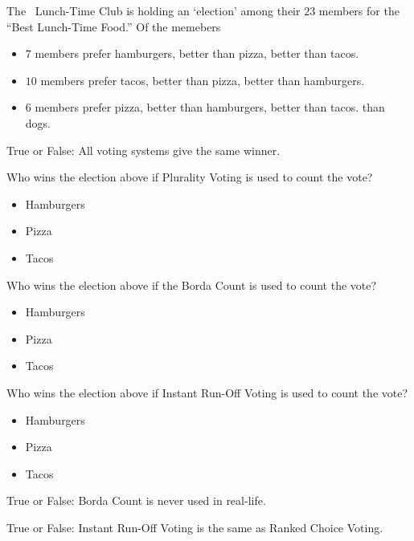\documentclass[nooutcomes,noauthor]{ximera}
\author{Bart Snapp}
\begin{document}
\maketitle

The \mooculus~Lunch-Time Club is holding an `election' among their
$23$ members for the ``Best Lunch-Time Food.'' Of the memebers
\begin{itemize}
\item $7$ members prefer hamburgers, better than pizza, better than tacos. 
\item $10$ members prefer tacos, better than pizza, better than hamburgers. 
\item $6$ members prefer pizza, better than hamburgers, better than tacos.
  than dogs.
\end{itemize}

\begin{exercise}
  True or False: All voting systems give the same winner.
 
\end{exercise}


\begin{exercise}
  Who wins the election above if Plurality Voting is used to count the
  vote?
  \begin{itemize}
  \item Hamburgers
  \item Pizza
  \item Tacos
  \end{itemize}
\end{exercise}



\begin{exercise}
  Who wins the election above if the Borda Count is used to count the
  vote?
  \begin{itemize}
  \item Hamburgers
  \item Pizza
  \item Tacos
  \end{itemize}
\end{exercise}



\begin{exercise}
  Who wins the election above if Instant Run-Off Voting is used to
  count the vote?
  \begin{itemize}
  \item Hamburgers
  \item Pizza
  \item Tacos
  \end{itemize}
\end{exercise}



\begin{exercise}
  True or False: Borda Count is never used in real-life.
\end{exercise}



\begin{exercise}
  True or False: Instant Run-Off Voting is the same as Ranked Choice Voting.
\end{exercise}


\end{document}
